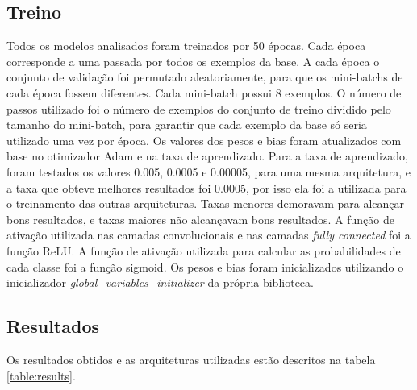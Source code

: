 \documentclass[conference]{IEEEtran}
\begin{document}
\subsection{Treino}
Todos os modelos analisados foram treinados por 50 épocas. Cada época corresponde a uma passada por todos os exemplos da base. A cada época o conjunto de validação foi permutado aleatoriamente, para que os mini-batchs de cada época fossem diferentes. Cada mini-batch possui 8 exemplos. O número de passos utilizado foi o número de exemplos do conjunto de treino dividido pelo tamanho do mini-batch, para garantir que cada exemplo da base só seria utilizado uma vez por época. Os valores dos pesos e bias foram atualizados com base no otimizador Adam e na taxa de aprendizado. Para a taxa de aprendizado, foram testados os valores 0.005, 0.0005 e 0.00005, para uma mesma arquitetura, e a taxa que obteve melhores resultados foi 0.0005, por isso ela foi a utilizada para o treinamento das outras arquiteturas. Taxas menores demoravam para alcançar bons resultados, e taxas maiores não alcançavam bons resultados. A função de ativação utilizada nas camadas convolucionais e nas camadas \textit{fully connected} foi a função ReLU. A função de ativação utilizada para calcular as probabilidades de cada classe foi a função sigmoid. Os pesos e bias foram inicializados utilizando o inicializador \textit{global\_variables\_initializer} da própria biblioteca.

\subsection{Resultados}
Os resultados obtidos e as arquiteturas utilizadas estão descritos na tabela \ref{table:results}. 
\end{document}
